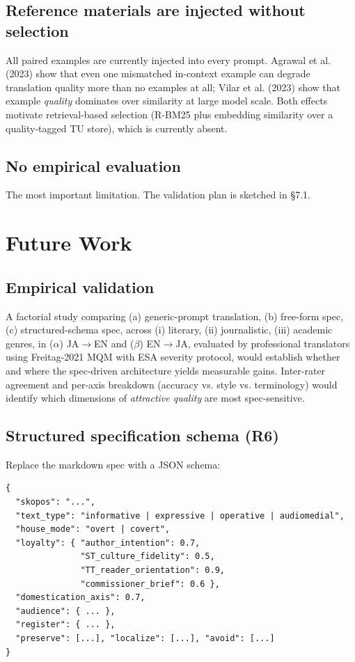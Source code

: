 \documentclass[11pt]{article}
\begin{document}
\subsection{Reference materials are injected without selection}

All paired examples are currently injected into every prompt. Agrawal et al. (2023) show that even one mismatched in-context example can degrade translation quality more than no examples at all; Vilar et al. (2023) show that example \emph{quality} dominates over similarity at large model scale. Both effects motivate retrieval-based selection (R-BM25 plus embedding similarity over a quality-tagged TU store), which is currently absent.

\subsection{No empirical evaluation}

The most important limitation. The validation plan is sketched in \S{}7.1.

\section{Future Work}

\subsection{Empirical validation}

A factorial study comparing (a) generic-prompt translation, (b) free-form spec, (c) structured-schema spec, across (i) literary, (ii) journalistic, (iii) academic genres, in ($\alpha$) JA$\rightarrow$EN and ($\beta$) EN$\rightarrow$JA, evaluated by professional translators using Freitag-2021 MQM with ESA severity protocol, would establish whether and where the spec-driven architecture yields measurable gains. Inter-rater agreement and per-axis breakdown (accuracy vs. style vs. terminology) would identify which dimensions of \emph{attractive quality} are most spec-sensitive.

\subsection{Structured specification schema (R6)}

Replace the markdown spec with a JSON schema:

\begin{verbatim}
{
  "skopos": "...",
  "text_type": "informative | expressive | operative | audiomedial",
  "house_mode": "overt | covert",
  "loyalty": { "author_intention": 0.7,
               "ST_culture_fidelity": 0.5,
               "TT_reader_orientation": 0.9,
               "commissioner_brief": 0.6 },
  "domestication_axis": 0.7,
  "audience": { ... },
  "register": { ... },
  "preserve": [...], "localize": [...], "avoid": [...]
}
\end{verbatim}
\end{document}
